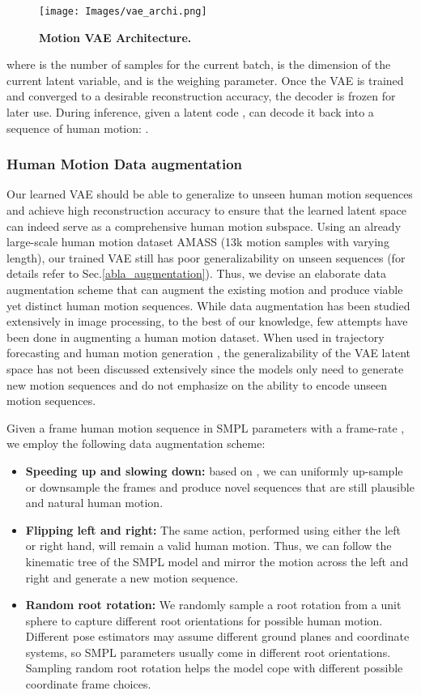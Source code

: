 \documentclass[runningheads]{llncs}
\begin{document}
\begin{figure}[ht]
    \centering
    \texttt{[image: Images/vae\_archi.png]}
    \caption{\textbf{Motion VAE Architecture.}}
    \label{fig:vae_archi}
\end{figure}



where  is the number of samples for the current batch,  is the dimension of the current latent variable, and  is the weighing parameter. Once the VAE is trained and converged to a desirable reconstruction accuracy, the decoder  is frozen for later use. During inference, given a latent code ,  can decode it back into a sequence of human motion: . 

\subsubsection{Human Motion Data augmentation}
\label{augmentation} 
 Our learned VAE should be able to generalize to unseen human motion sequences and achieve high reconstruction accuracy to ensure that the learned latent space can indeed serve as a comprehensive human motion subspace. Using an already large-scale human motion dataset AMASS \cite{amass} (13k motion samples with varying length), our trained VAE still has poor generalizability on unseen sequences (for details refer to Sec.\ref{abla_augmentation}). Thus, we devise an elaborate data augmentation scheme that can augment the existing motion and produce viable yet distinct human motion sequences. While data augmentation has been studied extensively in image processing, to the best of our knowledge, few attempts have been done in augmenting a human motion dataset. When used in trajectory forecasting \cite{diverse} and human motion generation \cite{Wang2019}, the generalizability of the VAE latent space has not been discussed extensively since the models only need to generate new motion sequences and do not emphasize on the ability to encode unseen motion sequences.

Given a  frame human motion sequence in SMPL parameters  with a frame-rate , we employ the following data augmentation scheme: 
\begin{itemize}
    \item \textbf{Speeding up and slowing down:} based on , we can uniformly up-sample or downsample the frames and produce novel sequences that are still plausible and natural human motion. 
    \item \textbf{Flipping left and right:} The same action, performed using either the left or right hand, will remain a valid human motion. Thus, we can follow the kinematic tree of the SMPL model and mirror the motion across the left and right and generate a new motion sequence.
    \item \textbf{Random root rotation:} We randomly sample a root rotation from a unit sphere to capture different root orientations for possible human motion. Different pose estimators may assume different ground planes and coordinate systems, so SMPL parameters usually come in different root orientations. Sampling random root rotation helps the model cope with different possible coordinate frame choices. 
\end{itemize}
\end{document}
